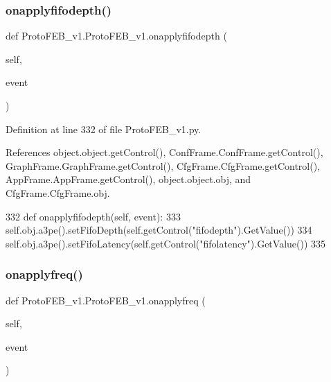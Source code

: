 \subsubsection{\texorpdfstring{onapplyfifodepth()}{onapplyfifodepth()}}
{\footnotesize\ttfamily def Proto\+F\+E\+B\+\_\+v1.\+Proto\+F\+E\+B\+\_\+v1.\+onapplyfifodepth (\begin{DoxyParamCaption}\item[{}]{self,  }\item[{}]{event }\end{DoxyParamCaption})}



Definition at line 332 of file Proto\+F\+E\+B\+\_\+v1.\+py.



References object.\+object.\+get\+Control(), Conf\+Frame.\+Conf\+Frame.\+get\+Control(), Graph\+Frame.\+Graph\+Frame.\+get\+Control(), Cfg\+Frame.\+Cfg\+Frame.\+get\+Control(), App\+Frame.\+App\+Frame.\+get\+Control(), object.\+object.\+obj, and Cfg\+Frame.\+Cfg\+Frame.\+obj.


\begin{DoxyCode}
332     \textcolor{keyword}{def }onapplyfifodepth(self, event):
333         self.obj.a3pe().setFifoDepth(self.getControl(\textcolor{stringliteral}{"fifodepth"}).GetValue())
334         self.obj.a3pe().setFifoLatency(self.getControl(\textcolor{stringliteral}{"fifolatency"}).GetValue())
335 
\end{DoxyCode}
\mbox{\label{classProtoFEB__v1_1_1ProtoFEB__v1_ac654ad0cdb32adcdb9a649ead2473739}} 
\subsubsection{\texorpdfstring{onapplyfreq()}{onapplyfreq()}}
{\footnotesize\ttfamily def Proto\+F\+E\+B\+\_\+v1.\+Proto\+F\+E\+B\+\_\+v1.\+onapplyfreq (\begin{DoxyParamCaption}\item[{}]{self,  }\item[{}]{event }\end{DoxyParamCaption})}



